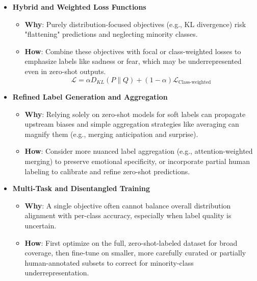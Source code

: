 \begin{itemize}
    \item \textbf{Hybrid and Weighted Loss Functions}
    \begin{itemize}
        \item \textbf{Why}: Purely distribution-focused objectives (e.g., KL divergence) risk "flattening" predictions and neglecting minority classes.
        \item \textbf{How}: Combine these objectives with focal or class-weighted losses to emphasize labels like sadness or fear, which may be underrepresented even in zero-shot outputs.
        \begin{equation}
            \mathcal{L} = \alpha D_{KL}(P \parallel Q) + (1-\alpha)\mathcal{L}_{\text{Class-weighted}}
        \end{equation}
    \end{itemize}
    
    \item \textbf{Refined Label Generation and Aggregation}
    \begin{itemize}
        \item \textbf{Why}: Relying solely on zero-shot models for soft labels can propagate upstream biases and simple aggregation strategies like averaging can magnify them (e.g., merging anticipation and surprise).
        \item \textbf{How}: Consider more nuanced label aggregation (e.g., attention-weighted merging) to preserve emotional specificity, or incorporate partial human labeling to calibrate and refine zero-shot predictions.
    \end{itemize}
    
    \item \textbf{Multi-Task and Disentangled Training}
    \begin{itemize}
        \item \textbf{Why}: A single objective often cannot balance overall distribution alignment with per-class accuracy, especially when label quality is uncertain.
        \item \textbf{How}: First optimize on the full, zero-shot-labeled dataset for broad coverage, then fine-tune on smaller, more carefully curated or partially human-annotated subsets to correct for minority-class underrepresentation.
    \end{itemize}
    

\end{itemize}
